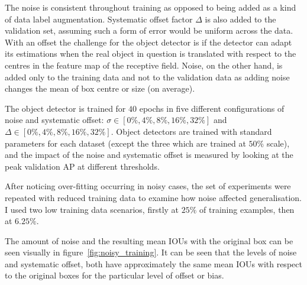 The noise is consistent throughout training as opposed to being added as a kind of data label augmentation. Systematic offset factor $\Delta$ is also added to the validation set, assuming such a form of error would be uniform across the data. With an offset the challenge for the object detector is if the detector can adapt its estimations when the real object in question is translated with respect to the centres in the feature map of the receptive field. Noise, on the other hand, is added only to the training data and not to the validation data as adding noise changes the mean of box centre or size (on average).

The object detector is trained for $40$ epochs in five different configurations of noise and systematic offset: $\sigma \in [0\%, 4\%, 8\%, 16\%, 32\%]$ and $\Delta \in [0\%, 4\%, 8\%, 16\%, 32\%]$. Object detectors are trained with standard parameters for each dataset (except the three which are trained at $50\%$ scale), and the impact of the noise and systematic offset is measured by looking at the peak validation \gls{AP} at different thresholds.

After noticing over-fitting occurring in noisy cases, the set of experiments were repeated with reduced training data to examine how noise affected generalisation. I used two low training data scenarios, firstly at $25\%$ of training examples, then at $6.25\%$.

The amount of noise and the resulting mean \gls{IOU}s with the original box can be seen visually in figure~\ref{fig:noisy_training}. It can be seen that the levels of noise and systematic offset, both have approximately the same mean \gls{IOU}s with respect to the original boxes for the particular level of offset or bias.


